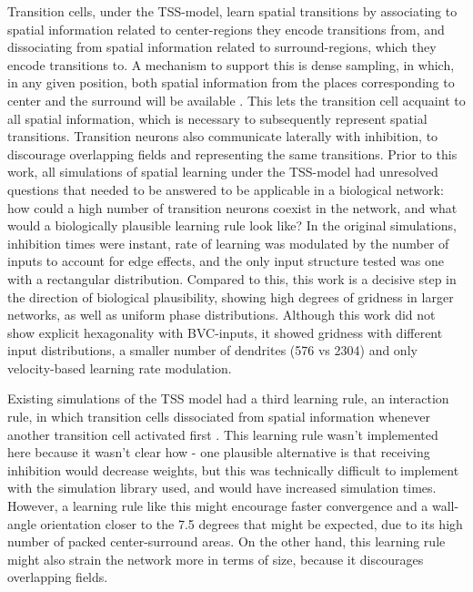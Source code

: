 \documentclass{article}
\begin{document}
    Transition cells, under the TSS-model, learn spatial transitions by associating to spatial information related to center-regions they encode transitions from, and dissociating from spatial information related to surround-regions, which they encode transitions to. A mechanism to support this is dense sampling, in which, in any given position, both spatial information from the places corresponding to center and the surround will be available \parencite{Waniek2020}. This lets the transition cell acquaint to all spatial information, which is necessary to subsequently represent spatial transitions. Transition neurons also communicate laterally with inhibition, to discourage overlapping fields and representing the same transitions. 
    Prior to this work, all simulations of spatial learning under the TSS-model had unresolved questions that needed to be answered to be applicable in a biological network: how could a high number of transition neurons coexist in the network, and what would a biologically plausible learning rule look like? In the original simulations, inhibition times were instant, rate of learning was modulated by the number of inputs to account for edge effects, and the only input structure tested was one with a rectangular distribution.
    Compared to this, this work is a decisive step in the direction of biological plausibility, showing high degrees of gridness in larger networks, as well as uniform phase distributions. Although this work did not show explicit hexagonality with BVC-inputs, it showed gridness with different input distributions, a smaller number of dendrites (576 vs 2304) and only velocity-based learning rate modulation.

    Existing simulations of the TSS model had a third learning rule, an interaction rule, in which transition cells dissociated from spatial information whenever another transition cell activated first \parencite{Waniek2017}. This learning rule wasn't implemented here because it wasn't clear how - one plausible alternative is that receiving inhibition would decrease weights, but this was technically difficult to implement with the simulation library used, and would have increased simulation times. However, a learning rule like this might encourage faster convergence and a wall-angle orientation closer to the 7.5 degrees that might be expected, due to its high number of packed center-surround areas. On the other hand, this learning rule might also strain the network more in terms of size, because it discourages overlapping fields.
\end{document}
